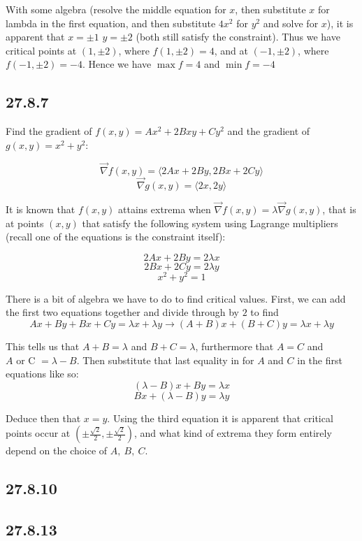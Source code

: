 \documentclass{article}
\begin{document}
With some algebra (resolve the middle equation for $x$, then substitute $x$ for lambda in the first equation, and then substitute $4x^2$ for $y^2$ and solve for $x$), it is apparent that $x = \pm 1$ $y = \pm 2$ (both still satisfy the constraint). Thus we have critical points at $(1,\pm 2)$, where $f(1,\pm 2) = 4$, and at $(- 1, \pm 2)$, where $f(-1,\pm 2) = -4$. Hence we have $\max f = 4$ and $\min f = -4$

\subsection{27.8.7}

Find the gradient of $f(x,y) = Ax^2 + 2Bxy + Cy^2$ and the gradient of $g(x,y) = x^2 + y^2$:

$$\vec{\nabla}f(x,y) = \langle 2Ax + 2By ,2Bx + 2Cy \rangle$$
$$\vec{\nabla}g(x,y) = \langle 2x,2y \rangle$$

It is known that $f(x,y)$ attains extrema when $\vec{\nabla}f(x,y) = \lambda \vec{\nabla}g(x,y)$, that is at points $(x,y)$ that satisfy the following system using Lagrange multipliers (recall one of the equations is the constraint itself):

$$2Ax + 2By = 2\lambda x$$
$$2Bx + 2Cy = 2\lambda y$$
$$x^2 + y^2 = 1$$

There is a bit of algebra we have to do to find critical values. First, we can add the first two equations together and divide through by $2$ to find $$Ax+By+Bx+Cy = \lambda x + \lambda y \to (A+B)x + (B+C)y = \lambda x + \lambda y$$

This tells us that $A+B = \lambda$ and $B+C = \lambda$, furthermore that $A=C$ and $A \text{ or C } = \lambda - B$. Then substitute that last equality in for $A$ and $C$ in the first equations like so:
$$(\lambda - B)x+By = \lambda x$$
$$Bx + (\lambda - B)y = \lambda y$$

Deduce then that $x = y$. Using the third equation it is apparent that critical points occur at $(\pm\frac{\sqrt{2}}{2}, \pm\frac{\sqrt{2}}{2})$, and what kind of extrema they form entirely depend on the choice of $A, ~B, ~C$.

\subsection{27.8.10}

\subsection{27.8.13}
\end{document}
